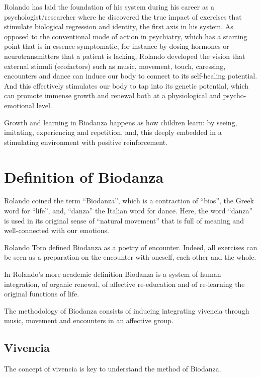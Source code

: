 \documentclass[
  11pt,
]{book}
\begin{document}
Rolando has laid the foundation of his system during his career as a psychologist/researcher where he discovered the true impact of exercises that stimulate biological regression and identity, the first axis in his system. As opposed to the conventional mode of action in psychiatry, which has a starting point that is in essence symptomatic, for instance by dosing hormones or neurotransmitters that a patient is lacking, Rolando developed the vision that external stimuli (ecofactors) such as music, movement, touch, caressing, encounters and dance can induce our body to connect to its self-healing potential. And this effectively stimulates our body to tap into its genetic potential, which can promote immense growth and renewal both at a physiological and psycho-emotional level.

Growth and learning in Biodanza happens as how children learn: by seeing, imitating, experiencing and repetition, and, this deeply embedded in a stimulating environment with positive reinforcement.

\hypertarget{definition-of-biodanza}{%
\section{Definition of Biodanza}\label{definition-of-biodanza}}

Rolando coined the term ``Biodanza'', which is a contraction of ``bios'', the Greek word for ``life'', and, ``danza'' the Italian word for dance. Here, the word ``danza'' is used in its original sense of ``natural movement'' that is full of meaning and well-connected with our emotions.

Rolando Toro defined Biodanza as a poetry of encounter. Indeed, all exercises can be seen as a preparation on the encounter with oneself, each other and the whole.

In Rolando's more academic definition Biodanza is a system of human integration, of organic renewal, of affective re-education and of re-learning the original functions of life.

The methodology of Biodanza consists of inducing integrating vivencia through music, movement and encounters in an affective group.

\hypertarget{vivencia}{%
\subsection{Vivencia}\label{vivencia}}

The concept of vivencia is key to understand the method of Biodanza.
\end{document}
